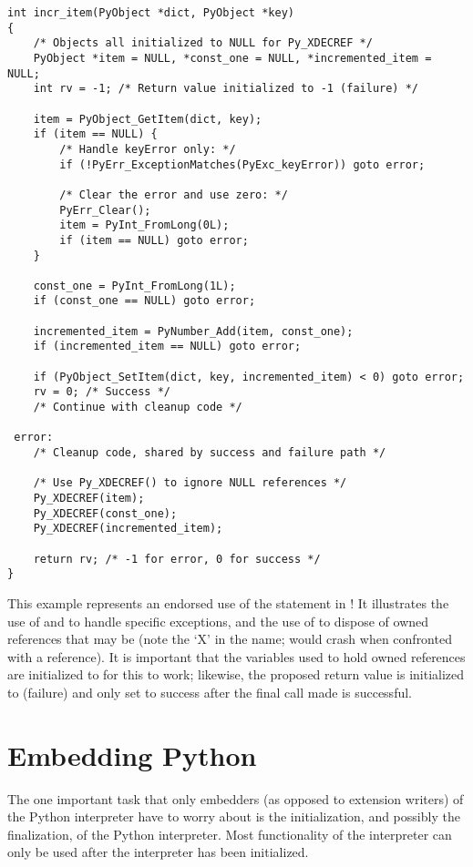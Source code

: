\documentclass[twoside,openright]{report}
\begin{document}
\begin{verbatim}
int incr_item(PyObject *dict, PyObject *key)
{
    /* Objects all initialized to NULL for Py_XDECREF */
    PyObject *item = NULL, *const_one = NULL, *incremented_item = NULL;
    int rv = -1; /* Return value initialized to -1 (failure) */

    item = PyObject_GetItem(dict, key);
    if (item == NULL) {
        /* Handle keyError only: */
        if (!PyErr_ExceptionMatches(PyExc_keyError)) goto error;

        /* Clear the error and use zero: */
        PyErr_Clear();
        item = PyInt_FromLong(0L);
        if (item == NULL) goto error;
    }

    const_one = PyInt_FromLong(1L);
    if (const_one == NULL) goto error;

    incremented_item = PyNumber_Add(item, const_one);
    if (incremented_item == NULL) goto error;

    if (PyObject_SetItem(dict, key, incremented_item) < 0) goto error;
    rv = 0; /* Success */
    /* Continue with cleanup code */

 error:
    /* Cleanup code, shared by success and failure path */

    /* Use Py_XDECREF() to ignore NULL references */
    Py_XDECREF(item);
    Py_XDECREF(const_one);
    Py_XDECREF(incremented_item);

    return rv; /* -1 for error, 0 for success */
}
\end{verbatim}

This example represents an endorsed use of the  statement 
in \C{}!  It illustrates the use of  and 
 to handle specific exceptions, and the use of 
 to dispose of owned references that may be 
\NULL{} (note the `X' in the name;  would crash 
when confronted with a \NULL{} reference).  It is important that 
the variables used to hold owned references are initialized to 
\NULL{} for this to work; likewise, the proposed return value is 
initialized to  (failure) and only set to success after
the final call made is successful.


\section{Embedding Python}

The one important task that only embedders (as opposed to extension
writers) of the Python interpreter have to worry about is the
initialization, and possibly the finalization, of the Python
interpreter.  Most functionality of the interpreter can only be used
after the interpreter has been initialized.
\end{document}
